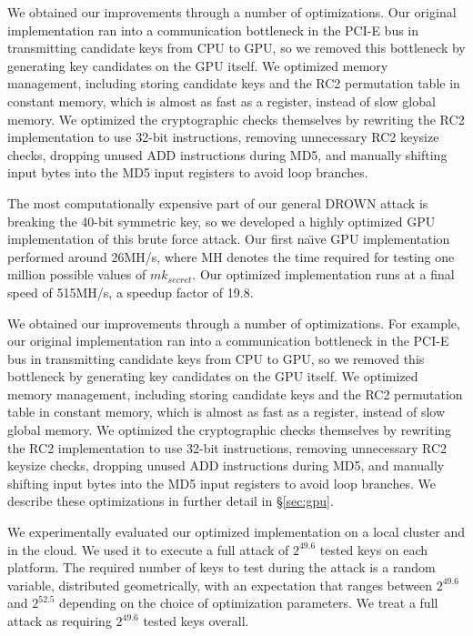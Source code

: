 \ifext
We obtained our improvements through a number of optimizations.  Our original implementation ran into a communication bottleneck in the PCI-E bus in transmitting candidate keys from CPU to GPU, so we removed this bottleneck by generating key candidates on the GPU itself.  We optimized memory management, including storing candidate keys and the RC2 permutation table in constant memory, which is almost as fast as a register, instead of slow global memory.  We optimized the cryptographic checks themselves by rewriting the RC2 implementation to use 32-bit instructions, removing unnecessary RC2 keysize checks, dropping unused ADD instructions during MD5, and manually shifting input bytes into the MD5 input registers to avoid loop branches.
\fi

\ifext

\label{sec:ec2_results}
\fi

The most computationally expensive part of our general DROWN attack is breaking the 40-bit symmetric key, so we developed a highly optimized GPU implementation of this brute force attack.  Our first na\"{\i}ve GPU implementation performed around 26MH/s, where MH denotes the time required for testing one million possible values of $mk_{secret}$. Our optimized implementation runs at a final speed of 515MH/s, a speedup factor of 19.8.  
\label{sec:gpu_brief}

We obtained our improvements through a number of optimizations.  For example, our original implementation ran into a communication bottleneck in the PCI-E bus in transmitting candidate keys from CPU to GPU, so we removed this bottleneck by generating key candidates on the GPU itself.  We optimized memory management, including storing candidate keys and the RC2 permutation table in constant memory, which is almost as fast as a register, instead of slow global memory. 
\ifext  We optimized the cryptographic checks themselves by rewriting the RC2 implementation to use 32-bit instructions, removing unnecessary RC2 keysize checks, dropping unused ADD instructions during MD5, and manually shifting input bytes into the MD5 input registers to avoid loop branches.  We describe these optimizations in further detail in \S\ref{sec:gpu}. \fi

We experimentally evaluated our optimized implementation on a local cluster and in the cloud.
We used it to execute a full attack of $2^{49.6}$ tested keys on each platform.
The required number of keys to test during the attack is a random variable, distributed geometrically, with an expectation that ranges between $2^{49.6}$ and $2^{52.5}$ depending on the choice of optimization parameters.
We treat a full attack as requiring $2^{49.6}$ tested keys overall.

